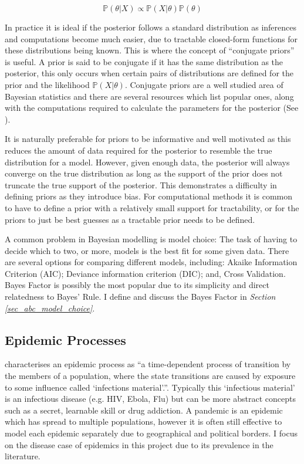 \documentclass[11pt,a4paper]{article}
\newcommand*{\prob}{\mathbb{P}}
\theoremstyle{break}
\begin{document}
  \[ \prob(\theta|X)\propto\prob(X|\theta)\prob(\theta) \]

  \par In practice it is ideal if the posterior follows a standard distribution as inferences and computations become much easier, due to tractable closed-form functions for these distributions being known. This is where the concept of ``conjugate priors'' is useful. A prior is said to be conjugate if it has the same distribution as the posterior, this only occurs when certain pairs of distributions are defined for the prior and the likelihood $\prob(X|\theta)$. Conjugate priors are a well studied area of Bayesian statistics and there are several resources which list popular ones, along with the computations required to calculate the parameters for the posterior (See \cite[]{compendium_of_conjugate_priors}).

  \par It is naturally preferable for priors to be informative and well motivated as this reduces the amount of data required for the posterior to resemble the true distribution for a model. However, given enough data, the posterior will always converge on the true distribution as long as the support of the prior does not truncate the true support of the posterior. This demonstrates a difficulty in defining priors as they introduce bias. For computational methods it is common to have to define a prior with a relatively small support for tractability, or for the priors to just be best guesses as a tractable prior needs to be defined.

  \par A common problem in Bayesian modelling is model choice: The task of having to decide which to two, or more, models is the best fit for some given data. There are several options for comparing different models, including: Akaike Information Criterion (AIC); Deviance information criterion (DIC); and, Cross Validation. Bayes Factor is possibly the most popular due to its simplicity and direct relatedness to Bayes' Rule. I define and discuss the Bayes Factor in \textit{Section \ref{sec_abc_model_choice}}.

\subsection{Epidemic Processes}\label{sec_epidemic_processes}

  \par \cite[]{epidemic_process_in_an_open_population} characterises an epidemic process as ``a time-dependent process of transition by the members of a population, where the state transitions are caused by exposure to some influence called `infections material'.''. Typically this `infectious material' is an infectious disease (e.g. HIV, Ebola, Flu) but can be more abstract concepts such as a secret, learnable skill or drug addiction. A pandemic is an epidemic which has spread to multiple populations, however it is often still effective to model each epidemic separately due to geographical and political borders. I focus on the disease case of epidemics in this project due to its prevalence in the literature.
\end{document}
